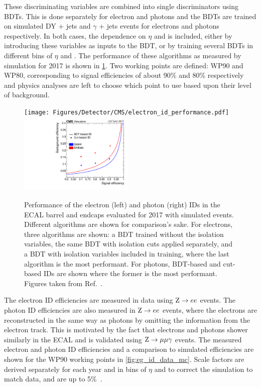These discriminating variables are combined into single discriminators using BDTs. This is done separately for electron and photons and the BDTs are trained on simulated DY + jets and $\gamma$ + jets events for electrons and photons respectively. In both cases, the dependence on $\eta$ and \ET is included, either by introducing these variables as inputs to the BDT, or by training several BDTs in different bins of $\eta$ and \ET. The performance of these algorithms as measured by simulation for 2017 is shown in \cref{fig:eg_id_performance}. Two working points are defined: WP90 and WP80, corresponding to signal efficiencies of about 90\% and 80\% respectively and physics analyses are left to choose which point to use based upon their level of background. 

\begin{figure}
  \texttt{[image: Figures/Detector/CMS/electron\_id\_performance.pdf]}
  \includegraphics[width=0.49\textwidth]{Figures/Detector/CMS/photon_id_performance.pdf}
  \caption[Electron and Photon Identification Performance]{Performance of the electron (left) and photon (right) IDs in the ECAL barrel and endcaps evaluated for 2017 with simulated events. Different algorithms are shown for comparison's sake. For electrons, three algorithms are shown: a BDT trained without the isolation variables, the same BDT with isolation cuts applied separately, and a BDT with isolation variables included in training, where the last algorithm is the most performant. For photons, BDT-based and cut-based IDs are shown where the former is the most performant. Figures taken from Ref.~\cite{CMS:2020uim}.}\label{fig:eg_id_performance}
\end{figure}

The electron ID efficiencies are measured in data using $\mathrm{Z}\rightarrow ee$ events. The photon ID efficiencies are also measured in $\mathrm{Z}\rightarrow ee$ events, where the electrons are reconstructed in the same way as photons by omitting the information from the electron track. This is motivated by the fact that electrons and photons shower similarly in the ECAL and is validated using $\mathrm{Z}\rightarrow\mu\mu\gamma$ events. The measured electron and photon ID efficiencies and a comparison to simulated efficiencies are shown for the WP90 working points in \cref{fig:eg_id_data_mc}. Scale factors are derived separately for each year and in bins of $\eta$ and \ET to correct the simulation to match data, and are up to 5\%~\cite{CMS:2020uim}. 

